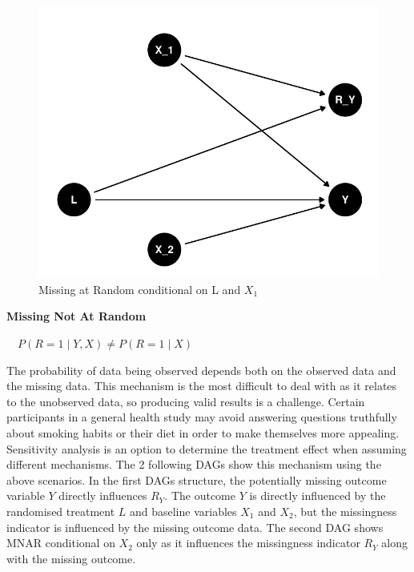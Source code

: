 \documentclass{article}
\begin{document}
\begin{figure}

{\centering \includegraphics{Final_Report_files/figure-latex/unnamed-chunk-3-1} 

}

\caption{Missing at Random conditional on L and \ensuremath{X_1}}\label{fig:unnamed-chunk-3}
\end{figure}

\textbf{Missing Not At Random}

\(\quad P(R = 1 \mid Y, X) \ne P(R = 1 \mid X)\)

The probability of data being observed depends both on the observed data
and the missing data. This mechanism is the most difficult to deal with
as it relates to the unobserved data, so producing valid results is a
challenge. Certain participants in a general health study may avoid
answering questions truthfully about smoking habits or their diet in
order to make themselves more appealing. Sensitivity analysis is an
option to determine the treatment effect when assuming different
mechanisms. The 2 following DAGs show this mechanism using the above
scenarios. In the first DAGs structure, the potentially missing outcome
variable \(Y\) directly influences \(R_Y\). The outcome \(Y\) is
directly influenced by the randomised treatment \(L\) and baseline
variables \(X_1\) and \(X_2\), but the missingness indicator is
influenced by the missing outcome data. The second DAG shows MNAR
conditional on \(X_2\) only as it influences the missingness indicator
\(R_Y\) along with the missing outcome.
\end{document}
